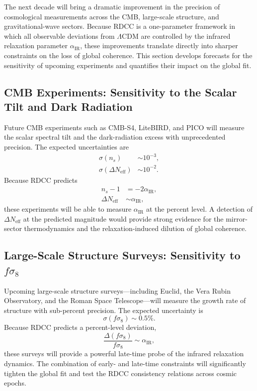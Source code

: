 \documentclass[11pt,a4paper]{article}
\begin{document}
The next decade will bring a dramatic improvement in the precision of cosmological
measurements across the CMB, large-scale structure, and gravitational-wave sectors. Because
RDCC is a one-parameter framework in which all observable deviations from $\Lambda$CDM are
controlled by the infrared relaxation parameter $\alpha_{\mathrm{IR}}$, these improvements translate
directly into sharper constraints on the loss of global coherence. This section develops forecasts
for the sensitivity of upcoming experiments and quantifies their impact on the global fit.

\subsection{CMB Experiments: Sensitivity to the Scalar Tilt and Dark Radiation}

Future CMB experiments such as CMB-S4, LiteBIRD, and PICO will measure the scalar spectral
tilt and the dark-radiation excess with unprecedented precision. The expected uncertainties are
\begin{align}
    \sigma(n_s) &\sim 10^{-3}, \\
    \sigma(\Delta N_{\mathrm{eff}}) &\sim 10^{-2}.
\end{align}
Because RDCC predicts
\begin{align}
    n_s - 1 &= -2\alpha_{\mathrm{IR}}, \\
    \Delta N_{\mathrm{eff}} &\sim \alpha_{\mathrm{IR}},
\end{align}
these experiments will be able to measure $\alpha_{\mathrm{IR}}$ at the percent level. A detection of
$\Delta N_{\mathrm{eff}}$ at the predicted magnitude would provide strong evidence for the mirror-sector
thermodynamics and the relaxation-induced dilution of global coherence.

\subsection{Large-Scale Structure Surveys: Sensitivity to \texorpdfstring{$f\sigma_8$}{fσ₈}}

Upcoming large-scale structure surveys—including Euclid, the Vera Rubin Observatory, and the
Roman Space Telescope—will measure the growth rate of structure with sub-percent precision.
The expected uncertainty is
\begin{equation}
    \sigma(f\sigma_8) \sim 0.5\%.
\end{equation}
Because RDCC predicts a percent-level deviation,
\begin{equation}
    \frac{\Delta(f\sigma_8)}{f\sigma_8} \sim \alpha_{\mathrm{IR}},
\end{equation}
these surveys will provide a powerful late-time probe of the infrared relaxation dynamics. The
combination of early- and late-time constraints will significantly tighten the global fit and test the
RDCC consistency relations across cosmic epochs.
\end{document}
